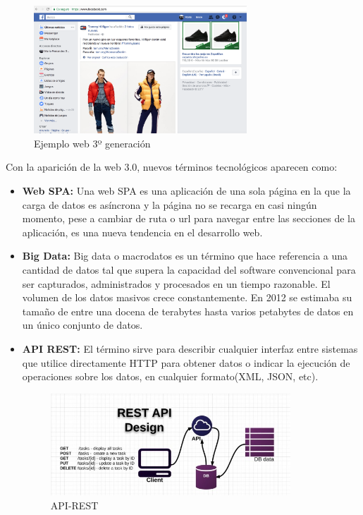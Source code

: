 \begin{figure}[H]
    \centering
    \includegraphics[width=80mm]{memoria/LaTeX/img/introduccion/facebook.png}
    \caption{Ejemplo web 3º generación}
\end{figure}

Con la aparición de la web 3.0, nuevos términos tecnológicos aparecen como:
\begin{itemize}
     \item \textbf{Web SPA: }Una web SPA es una aplicación de una sola página en la que la carga de datos es asíncrona y la página no se recarga en casi ningún momento, pese a cambiar de ruta o url para navegar entre las secciones de la aplicación, es una nueva tendencia en el desarrollo web.
     \item \textbf{Big Data: } Big data o macrodatos es un término que hace referencia a una cantidad de datos tal que supera la capacidad del software convencional para ser capturados, administrados y procesados en un tiempo razonable. El volumen de los datos masivos crece constantemente. En 2012 se estimaba su tamaño de entre una docena de terabytes hasta varios petabytes de datos en un único conjunto de datos.
    \item \textbf{API REST: } El término sirve para describir cualquier interfaz entre sistemas que utilice directamente HTTP para obtener datos o indicar la ejecución de operaciones sobre los datos, en cualquier formato(XML, JSON, etc).
    \begin{figure}[H]
    \centering
    \includegraphics[width=90mm]{memoria/LaTeX/img/introduccion/rest-api.jpg}
    \caption{API-REST}
    \end{figure}
\end{itemize}

